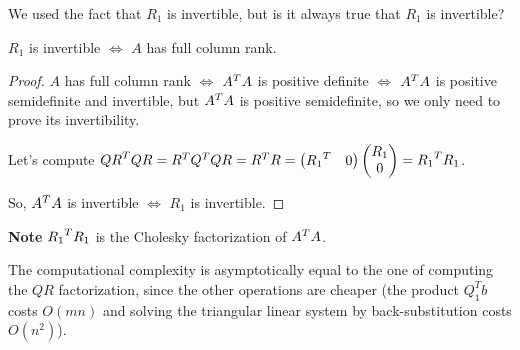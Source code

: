 \documentclass[ComputationalMathematics.tex]{subfiles}
\begin{document}
We used the fact that $R_{1}$ is invertible, but is it always true that $R_{1}$ is invertible?

\begin{lemma}
  $R_{1}$ is invertible $\Leftrightarrow$ $A$ has full column rank.
\end{lemma}

\begin{proof}
  $A$ has full column rank $\Leftrightarrow$ ${A}^{T}A$ is positive definite $\Leftrightarrow$ ${A}^{T}A$ is positive semidefinite and invertible, but ${A}^{T}A$ is positive semidefinite, so we only need to prove its invertibility.
  
  Let's compute ${QR}^{T} QR = {R}^{T} {Q}^{T} Q R = {R}^{T} R = \begin{pmatrix} {R_{1}}^{T} & 0 \end{pmatrix} \begin{pmatrix} R_{1}\\ 0 \end{pmatrix} = {R_{1}}^{T} R_1$.
    
    So, ${A}^{T}A$ is invertible $\Leftrightarrow$ $R_1$ is invertible.
\end{proof}

\begin{myframe}{\bf Note}
${R_{1}}^{T}R_{1}$ is the Cholesky factorization of ${A}^{T}A$.
\end{myframe}

The computational complexity is asymptotically equal to the one of computing the $QR$ factorization, since the other operations are cheaper (the product $Q_1^Tb$ costs $O(mn)$ and solving the triangular linear system by back-substitution costs $O(n^2)$).
\end{document}
